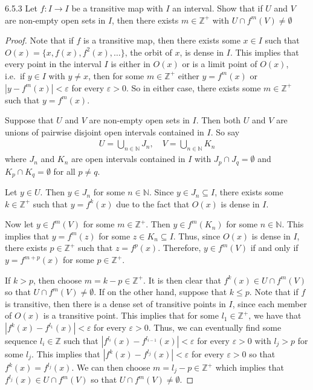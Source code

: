 \begin{problem}{6.5.3}
  Let $f: I\to I$ be a transitive map with $I$ an interval. Show that if $U$ and $V$
  are non-empty open sets in $I$, then there exists $m\in\mathbb{Z}^+$ with $U \cap f^m(V) \neq \emptyset$
\end{problem}

\begin{proof}
  Note that if $f$ is a transitive map, then there exists some $x \in I$ such that
  $O(x) = \{x, f(x), f^2(x), \ldots\}$, the orbit of $x$, is dense in $I$. This
  implies that every point in the interval $I$ is either in $O(x)$ or is a limit point
  of $O(x)$, i.e.\ if $y \in I$ with $y \neq x$, then for some $m\in\mathbb{Z}^+$ either $y = f^m(x)$
  or $|y - f^m(x)| < \varepsilon$ for every $\varepsilon > 0$. So in either case, there exists
  some $m \in \mathbb{Z}^+$ such that $y = f^m(x)$.

  Suppose that $U$ and $V$ are non-empty open sets in $I$. Then both $U$ and $V$ are unions of pairwise disjoint
  open intervals contained in $I$. So say
  \begin{align*}
    U = \bigcup_{n \in \mathbb{N}} J_n, \quad V = \bigcup_{n \in \mathbb{N}} K_n
  \end{align*}
  where $J_n$ and $K_n$ are open intervals contained in $I$ with $J_p \cap J_q = \emptyset$
  and $K_p \cap K_q = \emptyset$ for all $p \neq q$.

  Let $y \in U$. Then $y\in J_n$ for some $n \in \mathbb{N}$. Since $y \in J_n \subseteq I$,
  there exists some $k \in \mathbb{Z}^+$ such that $y = f^k(x)$ due to the fact that $O(x)$ is
  dense in $I$.

  Now let $y \in f^m (V)$ for some $m \in \mathbb{Z}^+$. Then $y \in f^m(K_n)$ for some $n \in \mathbb{N}$.
  This implies that $y = f^m(z)$ for some $z\in K_n \subseteq I$. Thus, since $O(x)$
  is dense in $I$, there exists $p\in\mathbb{Z}^+$ such that $z = f^p(x)$. Therefore,
  $y \in f^m(V)$ if and only if $y = f^{m+p}(x)$ for some $p \in \mathbb{Z}^+$.

  If $k > p$, then choose $m = k - p \in \mathbb{Z}^+$. It is then clear that $f^k(x) \in U \cap f^m(V)$ so
  that $U \cap f^m(V) \neq \emptyset$. If on the other hand, suppose that $k \leq p$.
  Note that if $f$ is transitive, then there is a dense set of transitive points in $I$, since each member of $O(x)$
  is a transitive point.
  This implies that for some $l_1 \in\mathbb{Z}^+$, we have that $|f^k(x) - f^{l_1}(x)| < \varepsilon$ for every $\varepsilon > 0$.
  Thus, we can eventually find some sequence $l_i \in \mathbb{Z}$ such that $|f^{l_i}(x) - f^{l_{i-1}}(x)| < \varepsilon$ for every $\varepsilon > 0$
  with $l_j > p$ for some $l_j$. This implies that $|f^k(x) - f^{l_j}(x)| < \varepsilon$ for every $\varepsilon > 0$
  so that $f^k(x) = f^{l_j}(x)$. We can then choose $m = l_j - p \in \mathbb{Z}^+$ which implies that
  $f^{l_j}(x) \in U \cap f^m(V)$ so that $U \cap f^m(V) \neq \emptyset$.

\end{proof}
\newpage
